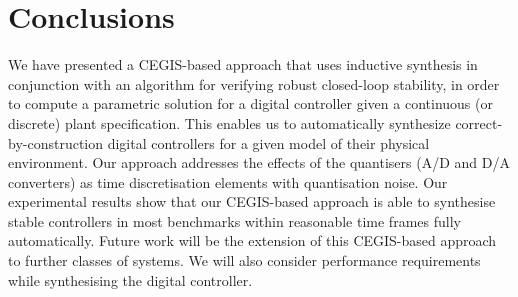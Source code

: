 \documentclass{sig-alternate-05-2015}
\begin{document}

\section{Conclusions}

We have presented a CEGIS-based approach that uses inductive synthesis in
conjunction with an algorithm for verifying robust closed-loop stability, 
in order to compute a parametric solution for a digital controller given 
a continuous (or discrete) plant specification.  This enables us to automatically
synthesize correct-by-construction digital controllers for a given model of
their physical environment.  Our approach addresses the effects of the
quantisers (A/D and D/A converters) as time discretisation elements with
quantisation noise.  Our experimental results show that our CEGIS-based
approach is able to synthesise stable controllers in most benchmarks within
reasonable time frames fully automatically.
%
%
Future work will be the extension of this CEGIS-based approach to further
classes of systems.  We will also consider performance requirements while
synthesising the digital controller.


  

\end{document}
